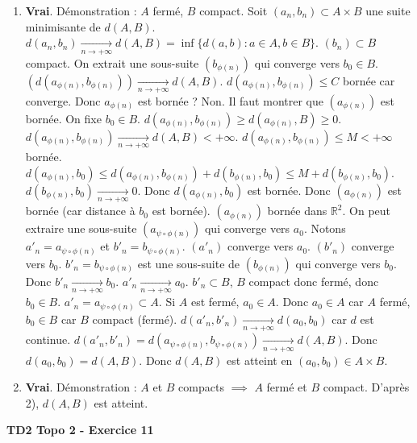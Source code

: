 \documentclass[oneside]{book}
\begin{document}
\begin{solution}
\begin{enumerate}
    \item \textbf{Vrai}. Démonstration : $A$ fermé, $B$ compact.
        Soit $(a_n, b_n) \subset A \times B$ une suite minimisante de $d(A, B)$.
        $d(a_n, b_n) \xrightarrow[n \to +\infty]{} d(A, B) = \inf \{d(a, b) : a \in A, b \in B\}$.
        $(b_n) \subset B$ compact. On extrait une sous-suite $(b_{\phi(n)})$ qui converge vers $b_0 \in B$.
        $(d(a_{\phi(n)}, b_{\phi(n)})) \xrightarrow[n \to +\infty]{} d(A, B)$.
        $d(a_{\phi(n)}, b_{\phi(n)}) \leq C$ bornée car converge. Donc $a_{\phi(n)}$ est bornée ? Non.
        Il faut montrer que $(a_{\phi(n)})$ est bornée. On fixe $b_0 \in B$.
        $d(a_{\phi(n)}, b_{\phi(n)}) \geq d(a_{\phi(n)}, B) \geq 0$.
        $d(a_{\phi(n)}, b_{\phi(n)}) \xrightarrow[n \to +\infty]{} d(A, B) < +\infty$.
        $d(a_{\phi(n)}, b_{\phi(n)}) \leq M < +\infty$ bornée.
        $d(a_{\phi(n)}, b_0) \leq d(a_{\phi(n)}, b_{\phi(n)}) + d(b_{\phi(n)}, b_0) \leq M + d(b_{\phi(n)}, b_0)$.
        $d(b_{\phi(n)}, b_0) \xrightarrow[n \to +\infty]{} 0$. Donc $d(a_{\phi(n)}, b_0)$ est bornée.
        Donc $(a_{\phi(n)})$ est bornée (car distance à $b_0$ est bornée).
        $(a_{\phi(n)})$ bornée dans $\mathbb{R}^2$. On peut extraire une sous-suite $(a_{\psi \circ \phi(n)})$ qui converge vers $a_0$.
        Notons $a'_n = a_{\psi \circ \phi(n)}$ et $b'_n = b_{\psi \circ \phi(n)}$.
        $(a'_n)$ converge vers $a_0$. $(b'_n)$ converge vers $b_0$.
        $b'_n = b_{\psi \circ \phi(n)}$ est une sous-suite de $(b_{\phi(n)})$ qui converge vers $b_0$. Donc $b'_n \xrightarrow[n \to +\infty]{} b_0$.
        $a'_n \xrightarrow[n \to +\infty]{} a_0$.
        $b'_n \subset B$, $B$ compact donc fermé, donc $b_0 \in B$.
        $a'_n = a_{\psi \circ \phi(n)} \subset A$. Si $A$ est fermé, $a_0 \in A$.
        Donc $a_0 \in A$ car $A$ fermé, $b_0 \in B$ car $B$ compact (fermé).
        $d(a'_n, b'_n) \xrightarrow[n \to +\infty]{} d(a_0, b_0)$ car $d$ est continue.
        $d(a'_n, b'_n) = d(a_{\psi \circ \phi(n)}, b_{\psi \circ \phi(n)}) \xrightarrow[n \to +\infty]{} d(A, B)$.
        Donc $d(a_0, b_0) = d(A, B)$. Donc $d(A, B)$ est atteint en $(a_0, b_0) \in A \times B$.

    \item \textbf{Vrai}. Démonstration : $A$ et $B$ compacts $\implies$ $A$ fermé et $B$ compact. D'après 2), $d(A, B)$ est atteint.
\end{enumerate}
\end{solution}

\textbf{TD2 Topo 2 - Exercice 11}
\end{document}
